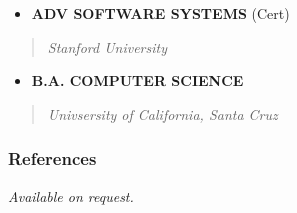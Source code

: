 \documentclass[8pt, a4paper]{article}
\providecommand{\tightlist}{%
  \setlength{\itemsep}{0pt}\setlength{\parskip}{0pt}}
\begin{document}
\begin{multicols}{2}
\begin{small}
\begin{raggedright}
\begin{itemize}
\tightlist
\item
  \textbf{ADV SOFTWARE SYSTEMS} (Cert)
\end{itemize}

\begin{quote}
\emph{Stanford University}
\end{quote}

\begin{itemize}
\tightlist
\item
  \textbf{B.A. COMPUTER SCIENCE}
\end{itemize}

\begin{quote}
\emph{Univsersity of California, Santa Cruz}
\end{quote}

\hypertarget{references}{%
\subsubsection{References}\label{references}}

\emph{Available on request.}
\end{raggedright}
\end{small}
\end{multicols}
\end{document}
